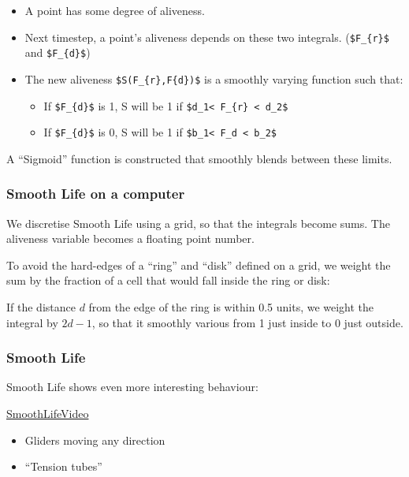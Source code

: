 \begin{itemize}
\itemsep1pt\parskip0pt
\item
  A point has some degree of aliveness.
\item
  Next timestep, a point's aliveness depends on these two integrals.
  (\texttt{\$F\_\{r\}\$} and \texttt{\$F\_\{d\}\$})
\item
  The new aliveness \texttt{\$S(F\_\{r\},F\{d\})\$} is a smoothly
  varying function such that:

  \begin{itemize}
  \itemsep1pt\parskip0pt
  \item
    If \texttt{\$F\_\{d\}\$} is 1, S will be 1 if
    \texttt{\$d\_1\textless{} F\_\{r\} \textless{} d\_2\$}
  \item
    If \texttt{\$F\_\{d\}\$} is 0, S will be 1 if
    \texttt{\$b\_1\textless{} F\_d \textless{} b\_2\$}
  \end{itemize}
\end{itemize}

A ``Sigmoid'' function is constructed that smoothly blends between these
limits.

\subsubsection{Smooth Life on a
computer}\label{smooth-life-on-a-computer}

We discretise Smooth Life using a grid, so that the integrals become
sums. The aliveness variable becomes a floating point number.

To avoid the hard-edges of a ``ring'' and ``disk'' defined on a grid, we
weight the sum by the fraction of a cell that would fall inside the ring
or disk:

If the distance $d$ from the edge of the ring is within 0.5 units, we
weight the integral by $2d-1$, so that it smoothly various from 1 just
inside to 0 just outside.

\subsubsection{Smooth Life}\label{smooth-life-3}

Smooth Life shows even more interesting behaviour:

\href{https://www.youtube.com/watch?v=KJe9H6qS82I}{SmoothLifeVideo}

\begin{itemize}
\itemsep1pt\parskip0pt
\item
  Gliders moving any direction
\item
  ``Tension tubes''
\end{itemize}

